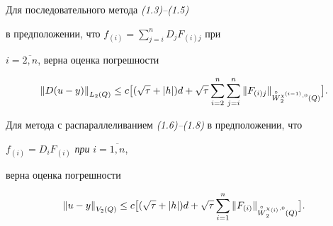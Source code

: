 \begin{thm} Для последовательного метода {\em (1.3)--(1.5)}


в предположении, что $f_{(i)}=\sum\limits_{j=i}^nD_jF_{(i)j}$ при


$i=\overline{2,n}$, верна оценка погрешности


\begin{equation}


{\ver D(u-y)\ver}_{L_2(Q)}\le c\bigl[(\po)d


+\sqrt\tau\sum_{i=2}^n\sum_{j=i}^n


{\ver F_{(i)j}\ver}_{\overset{\circ}{W}{}_2^{{\chi^{(i-1)}},0}(Q)}\bigr].


\end{equation}





Для метода с распараллеливанием {\em (1.6)--(1.8)} в предположении, что


$f_{(i)}=D_iF_{(i)}$ {\it при} $i=\overline{1,n}$, 


верна оценка погрешности


\begin{equation}


{\ver u-y\ver}_{V_2(Q)}\le c\bigl[(\po)d


+\sqrt\tau\sum_{i=1}^n


{\ver F_{(i)}\ver}_{\overset{\circ} {W}{}_2^{{\chi_{\langle i\rangle}},0}(Q)}\bigr].


\end{equation}


\end{thm}





